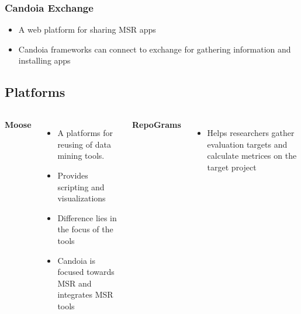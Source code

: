         \begin{frame}
            \frametitle{Candoia Exchange}
            \begin{itemize}
                \item A web platform for sharing MSR apps
                \item Candoia frameworks can connect to exchange for gathering information and  installing apps
            \end{itemize}
         \end{frame}

    \subsection{Platforms}
        \begin{frame}
            \begin{columns}
                    \textbf{Moose}
                    \begin{itemize}
                      \item A platforms for reusing of data mining tools.
                      \item Provides scripting and visualizations
                      \item Difference lies in the focus of the tools
                      \item Candoia is focused towards MSR and integrates MSR tools
                    \end{itemize}

                \textbf{RepoGrams}
                    \begin{itemize}
                      \item Helps researchers gather evaluation targets and calculate metrices on the target project
                    \end{itemize}
            \end{columns}
        \end{frame}

